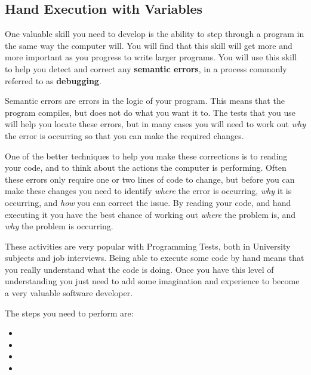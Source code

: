 
\clearpage
\subsection{Hand Execution with Variables} %
\label{sub:hand_execution_with_variables}

One valuable skill you need to develop is the ability to step through a program in the same way the computer will. You will find that this skill will get more and more important as you progress to write larger programs. You will use this skill to help you detect and correct any \textbf{semantic errors}, in a process commonly referred to as \textbf{debugging}.

Semantic errors are errors in the logic of your program. This means that the program compiles, but does not do what you want it to. The tests that you use will help you locate these errors, but in many cases you will need to work out \emph{why} the error is occurring so that you can make the required changes.

One of the better techniques to help you make these corrections is to reading your code, and to think about the actions the computer is performing. Often these errors only require one or two lines of code to change, but before you can make these changes you need to identify \emph{where} the error is occurring, \emph{why} it is occurring, and \emph{how} you can correct the issue. By reading your code, and hand executing it you have the best chance of working out \emph{where} the problem is, and \emph{why} the problem is occurring.

These activities are very popular with Programming Tests, both in University subjects and job interviews. Being able to execute some code by hand means that you really understand what the code is doing. Once you have this level of understanding you just need to add some imagination and experience to become a very valuable software developer.

The steps you need to perform are:
\begin{itemize}
  \item {}
  \item {}
  \item {}
  \item {}
\end{itemize}

